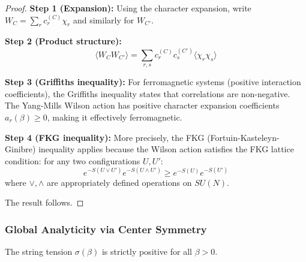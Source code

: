 \begin{proof}
\textbf{Step 1 (Expansion):}
Using the character expansion, write $W_C = \sum_r c_r^{(C)} \chi_r$ and similarly for $W_{C'}$.

\textbf{Step 2 (Product structure):}
\begin{equation}
\langle W_C W_{C'} \rangle = \sum_{r,s} c_r^{(C)} c_s^{(C')} \langle \chi_r \chi_s \rangle
\end{equation}

\textbf{Step 3 (Griffiths inequality):}
For ferromagnetic systems (positive interaction coefficients), the Griffiths inequality states that correlations are non-negative. The Yang-Mills Wilson action has positive character expansion coefficients $a_r(\beta) \geq 0$, making it effectively ferromagnetic.

\textbf{Step 4 (FKG inequality):}
More precisely, the FKG (Fortuin-Kasteleyn-Ginibre) inequality applies because the Wilson action satisfies the FKG lattice condition: for any two configurations $U, U'$:
\begin{equation}
e^{-S(U \vee U')} e^{-S(U \wedge U')} \geq e^{-S(U)} e^{-S(U')}
\end{equation}
where $\vee, \wedge$ are appropriately defined operations on $SU(N)$.

The result follows.
\end{proof}

\subsubsection{Global Analyticity via Center Symmetry}

\begin{theorem}
\label{thm:global_analyticity_rigorous}
The string tension $\sigma(\beta)$ is strictly positive for all $\beta > 0$.
\end{theorem}

